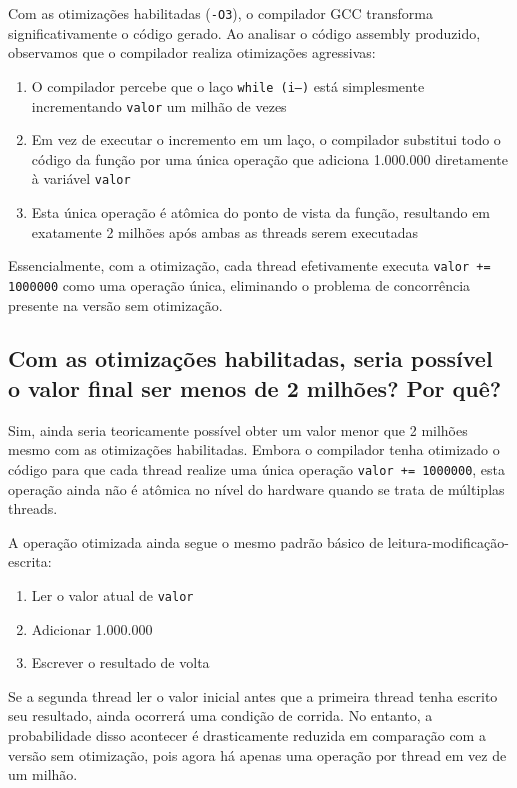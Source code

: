 \documentclass[12pt]{article}
\begin{document}
Com as otimizações habilitadas (\texttt{-O3}), o compilador GCC transforma significativamente o código gerado. Ao analisar o código assembly produzido, observamos que o compilador realiza otimizações agressivas:

\begin{enumerate}
    \item O compilador percebe que o laço \texttt{while (i--)} está simplesmente incrementando \texttt{valor} um milhão de vezes
    \item Em vez de executar o incremento em um laço, o compilador substitui todo o código da função por uma única operação que adiciona 1.000.000 diretamente à variável \texttt{valor}
    \item Esta única operação é atômica do ponto de vista da função, resultando em exatamente 2 milhões após ambas as threads serem executadas
\end{enumerate}

Essencialmente, com a otimização, cada thread efetivamente executa \texttt{valor += 1000000} como uma operação única, eliminando o problema de concorrência presente na versão sem otimização.

\subsection{Com as otimizações habilitadas, seria possível o valor final ser menos de 2 milhões? Por quê?}

Sim, ainda seria teoricamente possível obter um valor menor que 2 milhões mesmo com as otimizações habilitadas. Embora o compilador tenha otimizado o código para que cada thread realize uma única operação \texttt{valor += 1000000}, esta operação ainda não é atômica no nível do hardware quando se trata de múltiplas threads.

A operação otimizada ainda segue o mesmo padrão básico de leitura-modificação-escrita:

\begin{enumerate}
    \item Ler o valor atual de \texttt{valor}
    \item Adicionar 1.000.000
    \item Escrever o resultado de volta
\end{enumerate}

Se a segunda thread ler o valor inicial antes que a primeira thread tenha escrito seu resultado, ainda ocorrerá uma condição de corrida. No entanto, a probabilidade disso acontecer é drasticamente reduzida em comparação com a versão sem otimização, pois agora há apenas uma operação por thread em vez de um milhão.
\end{document}
